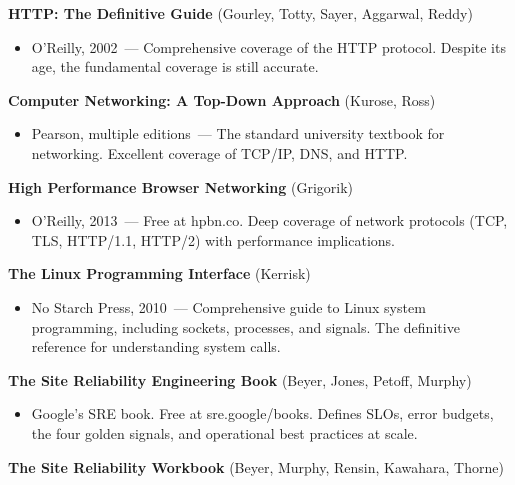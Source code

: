\label{44-appendices:d3-networking-and-http}

\textbf{HTTP: The Definitive Guide} (Gourley, Totty, Sayer, Aggarwal, Reddy)

\begin{itemize}
\tightlist
\item
  O'Reilly, 2002~--- Comprehensive coverage of the HTTP protocol. Despite its age, the fundamental coverage is still accurate.
\end{itemize}

\noindent{}\textbf{Computer Networking: A Top-Down Approach} (Kurose, Ross)

\begin{itemize}
\tightlist
\item
  Pearson, multiple editions~--- The standard university textbook for networking. Excellent coverage of TCP/IP, DNS, and HTTP.
\end{itemize}

\noindent{}\textbf{High Performance Browser Networking} (Grigorik)

\begin{itemize}
\tightlist
\item
  O'Reilly, 2013~--- Free at hpbn.co. Deep coverage of network protocols (TCP, TLS, HTTP/1.1, HTTP/2) with performance implications.
\end{itemize}

\noindent{}\textbf{The Linux Programming Interface} (Kerrisk)

\begin{itemize}
\tightlist
\item
  No Starch Press, 2010~--- Comprehensive guide to Linux system programming, including sockets, processes, and signals. The definitive reference for understanding system calls.
\end{itemize}

\label{44-appendices:d4-production-operations}

\textbf{The Site Reliability Engineering Book} (Beyer, Jones, Petoff, Murphy)

\begin{itemize}
\tightlist
\item
  Google's SRE book. Free at sre.google/books. Defines SLOs, error budgets, the four golden signals, and operational best practices at scale.
\end{itemize}

\noindent{}\textbf{The Site Reliability Workbook} (Beyer, Murphy, Rensin, Kawahara, Thorne)

